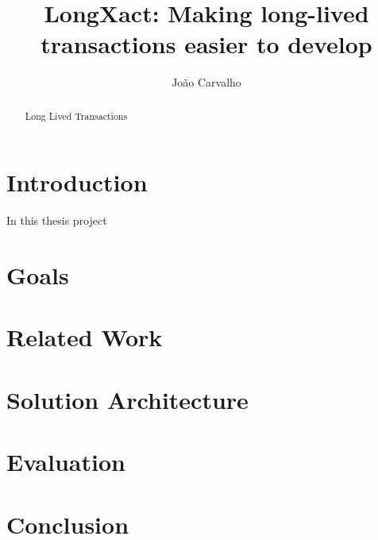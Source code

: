 \documentclass{llncs}
\begin{document}
\title{LongXact: Making long-lived transactions easier to develop}

\author{João Carvalho}
\maketitle


\begin{abstract}
Long Lived Transactions 
\end{abstract}


\section{Introduction}

In this thesis project

\section{Goals}

\section{Related Work}

\section{Solution Architecture}

\section{Evaluation}

\section{Conclusion}
\end{document}
